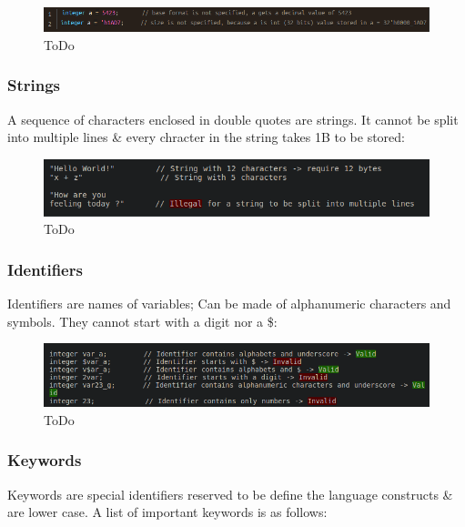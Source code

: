 \documentclass{article}
\begin{document}
	\begin{figure}[H]
		\includegraphics[width=\linewidth]{VerilogPics/figure_7.png}
		\caption{ToDo}
		\label{ToDo}
	\end{figure}
	\subsubsection{Strings} 

	A sequence of characters enclosed in double quotes are strings. It cannot be split into multiple lines \& every chracter in the string takes 1B to be stored:

	\begin{figure}[H]
		\includegraphics[width=\linewidth]{VerilogPics/figure_8.png}
		\caption{ToDo}
		\label{ToDo}
	\end{figure}
	
	\subsubsection{Identifiers} 

	Identifiers are names of variables; Can be made of alphanumeric characters and symbols. They cannot start with a digit nor a \$:

	\begin{figure}[H]
		\includegraphics[width=\linewidth]{VerilogPics/figure_9.png}
		\caption{ToDo}
		\label{ToDo}
	\end{figure}

	\subsubsection{Keywords}

	Keywords are special identifiers reserved to be define the language constructs \& are lower case. A list of important keywords is as follows:
\end{document}
